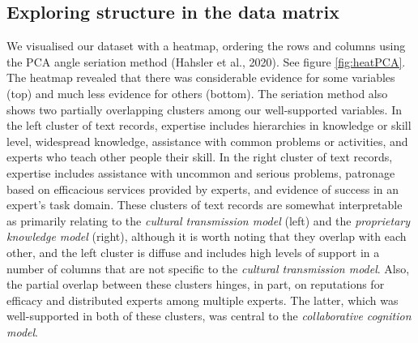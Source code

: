 \documentclass[
  11pt,
]{article}
\begin{document}
\hypertarget{exploring-structure-in-the-data-matrix}{%
\subsection{Exploring structure in the data matrix}\label{exploring-structure-in-the-data-matrix}}

We visualised our dataset with a heatmap, ordering the rows and columns using the PCA angle seriation method (Hahsler et al., 2020). See figure \ref{fig:heatPCA}. The heatmap revealed that there was considerable evidence for some variables (top) and much less evidence for others (bottom). The seriation method also shows two partially overlapping clusters among our well-supported variables. In the left cluster of text records, expertise includes hierarchies in knowledge or skill level, widespread knowledge, assistance with common problems or activities, and experts who teach other people their skill. In the right cluster of text records, expertise includes assistance with uncommon and serious problems, patronage based on efficacious services provided by experts, and evidence of success in an expert's task domain. These clusters of text records are somewhat interpretable as primarily relating to the \emph{cultural transmission model} (left) and the \emph{proprietary knowledge model} (right), although it is worth noting that they overlap with each other, and the left cluster is diffuse and includes high levels of support in a number of columns that are not specific to the \emph{cultural transmission model}. Also, the partial overlap between these clusters hinges, in part, on reputations for efficacy and distributed experts among multiple experts. The latter, which was well-supported in both of these clusters, was central to the \emph{collaborative cognition model}.
\end{document}
